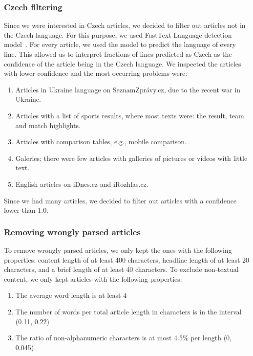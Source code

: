 \subsubsection{Czech filtering}
Since we were interested in Czech articles, we decided to filter out articles
not in the Czech language. For this purpose,
we used FastText Language detection model~\parencites{joulinFastTextZipCompressing2016}{joulinBagTricksEfficient2016}.
For every article, we used the model to predict the language of every line.
This allowed us to interpret fractions of lines predicted as Czech as the confidence of the article being in the Czech language.
We inspected the articles with lower confidence and the most occurring problems were:
\begin{enumerate}
    \item Articles in Ukraine language on SeznamZprávy.cz, due to the recent war in Ukraine.
    \item Articles with a list of sports results, where most texts were:
          the result, team and match highlights.
    \item Articles with comparison tables, e.g., mobile comparison.
    \item Galeries; there were few articles with galleries of pictures or videos with little text.
    \item English articles on iDnes.cz and iRozhlas.cz.
\end{enumerate}
Since we had many articles, we decided to filter out articles with a confidence lower than 1.0.

\subsubsection{Removing wrongly parsed articles}
\label{sec:filtering-by-article-statistics}
To remove wrongly parsed articles, we only kept the ones with the following properties:
content length of at least 400 characters, headline length
of at least 20 characters, and a brief length of at least 40 characters.
To exclude non-textual content, we only kept articles with the following properties:
\begin{enumerate}
    \item The average word length is at least 4
    \item The number of words per total article length in characters is in the interval
(0.11, 0.22)
    \item The ratio of non-alphanumeric characters is at most 4.5\% per length
(0, 0.045)
\end{enumerate}

